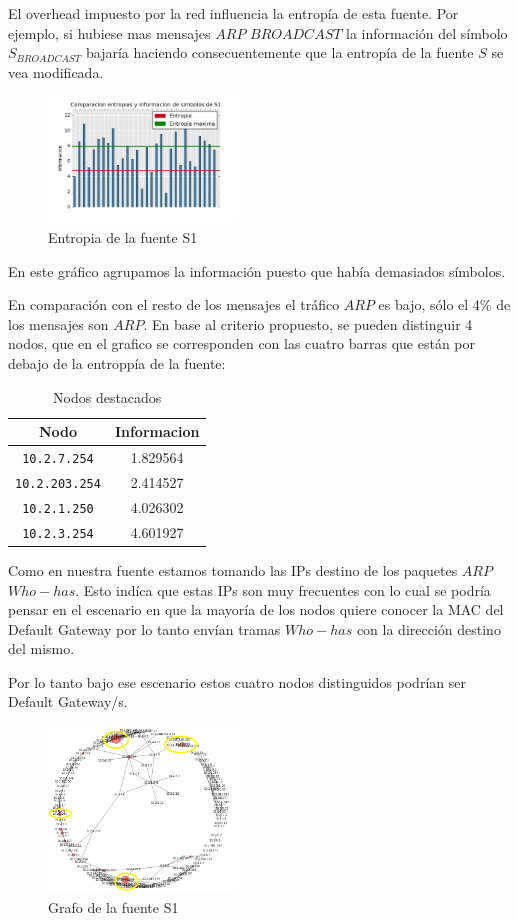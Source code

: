 El overhead impuesto por la red influencia la entropía de esta fuente.
Por ejemplo, si hubiese mas mensajes $ARP$ $BROADCAST$ la información del símbolo $S_{BROADCAST}$ bajaría haciendo consecuentemente que la entropía de la fuente $S$ se vea modificada.

\begin{figure}[h]
  \centering
    \includegraphics[width=0.45\textwidth]{grafico2-red-labos.png}
  \caption{Entropia de la fuente S1}
  \label{entropia-s1}
\end{figure}
En este gráfico agrupamos la información puesto que había demasiados símbolos.

En comparación con el resto de los mensajes el tráfico $ARP$ es bajo, sólo el 4\% de los mensajes son $ARP$. En base al criterio propuesto, se pueden distinguir 4 nodos, que en el grafico se corresponden con las cuatro barras que están por debajo de la entroppía de la fuente:   

    \begin{table}[ht]\begin{center}
      \begin{tabular}{|c|c|}
      \hline
      \textbf{Nodo} & \textbf{Informacion} \\ \hline
      \texttt{10.2.7.254}& 1.829564 \\ \hline
      \texttt{10.2.203.254}& 2.414527 \\ \hline
      \texttt{10.2.1.250}& 4.026302 \\ \hline
      \texttt{10.2.3.254}& 4.601927 \\ \hline
      \end{tabular}
      \caption{Nodos destacados}
      \label{Nodos-destacados}
    \end{center}\end{table}

Como en nuestra fuente estamos tomando las IPs destino de los paquetes $ARP$ $Who-has$. Esto indíca que estas IPs son muy frecuentes con lo cual se podría pensar en el escenario en que la mayoría de los nodos quiere conocer la MAC del Default Gateway por lo tanto envían tramas $Who-has$ con la dirección destino del mismo.

Por lo tanto bajo ese escenario estos cuatro nodos distinguidos podrían ser Default Gateway/s. 


\begin{figure}[h]
  \centering
    \includegraphics[width=0.45\textwidth]{grafo-red-labos-destacados.png}
  \caption{Grafo de la fuente S1}
  \label{grafo-s1}
\end{figure}
